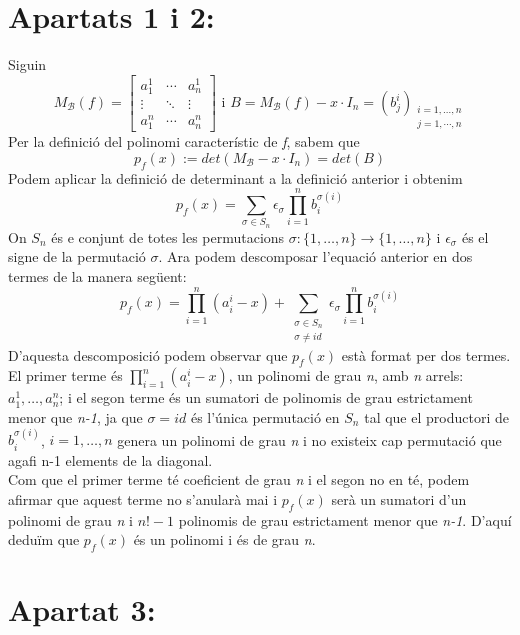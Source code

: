 \documentclass[a4paper, 11pt]{article}
\begin{document}
    \section*{Apartats 1 i 2:}
    Siguin
    $$
        M_\mathcal{B}(f) = 
        \begin{bmatrix}
            a_1^1 & \cdots & a^1_n\\
            \vdots & \ddots & \vdots\\
            a^n_1 & \cdots & a^n_n    
        \end{bmatrix}
        \text{ i }
        B = M_\mathcal{B}(f) - x\cdot I_n = (b^i_j)_{\substack{i = 1,\dots,n\\j = 1,\cdots,n}}
    $$
    Per la definici\'o del polinomi caracter\'istic de \emph{f}, sabem que
    $$
        p_f(x) := det(M_\mathcal{B} - x\cdot I_n) = det(B)
    $$
    Podem aplicar la definici\'o de determinant a la definici\'o anterior i obtenim
    $$
        p_f(x) = \sum_{\sigma\in S_n}\epsilon_\sigma \prod_{i=1}^n b_i^{\sigma(i)}
    $$
    On $S_n$ \'es e conjunt de totes les permutacions $\sigma : \{1,\dots,n\} \longrightarrow \{1,\dots,n\}$ i $\epsilon_\sigma$ \'es el signe de la permutaci\'o $\sigma$. Ara podem descomposar l'equaci\'o anterior en dos termes de la manera seg\"uent:
    $$
        p_f(x) = \prod_{i=1}^n (a^i_i -x) + \sum_{\substack{\sigma \in S_n\\ \sigma \neq id}} \epsilon_\sigma \prod_{i=1}^n b_i^{\sigma(i)}
    $$
    D'aquesta descomposici\'o podem observar que $p_f(x)$ est\`a format per dos termes. El primer terme \'es $\prod_{i=1}^n (a^i_i -x)$, un polinomi de grau \emph{n}, amb \emph{n} arrels: $a_1^1,\dots,a_n^n$; i el segon terme \'es un sumatori de polinomis de grau estrictament menor que \emph{n-1}, ja que $\sigma = id$ \'es l'\'unica permutaci\'o en $S_n$ tal que el productori de $b_i^{\sigma (i)}$, $i = 1,\dots,n$ genera un polinomi de grau \emph{n} i no existeix cap permutaci\'o que agafi n-1 elements de la diagonal.\\
    Com que el primer terme t\'e coeficient de grau \emph{n} i el segon no en t\'e, podem afirmar que aquest terme no s'anular\`a mai i $p_f(x)$ ser\`a un sumatori d'un polinomi de grau \emph{n} i $n! -1$ polinomis de grau estrictament menor que \emph{n-1}. D'aqu\'i dedu\"im que $p_f(x)$ \'es un polinomi i \'es de grau \emph{n}.
    \section*{Apartat 3:}
\end{document}
